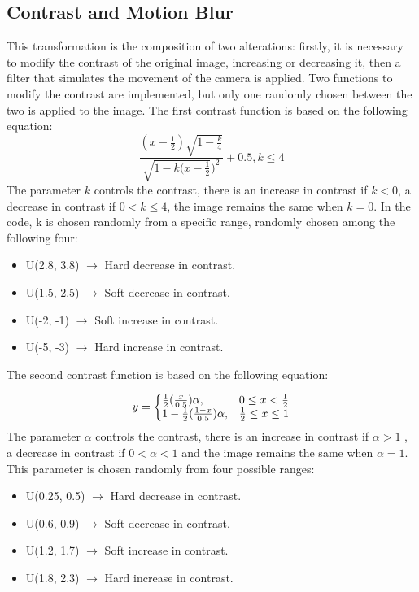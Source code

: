 \subsection{Contrast and Motion Blur}
This transformation is the composition of two alterations: firstly, it is necessary to modify the contrast of the original image, increasing or decreasing it, then a filter that simulates the movement of the camera is applied. Two functions to modify the contrast are implemented, but only one randomly chosen between the two is applied to the image.
The first contrast function is based on the following equation:
\[
	\frac{(x-\frac{1}{2})\sqrt{1-\frac{k}{4}}}{\sqrt{1-k(x-\frac{1}{2}})^2} + 0.5,  k\leq4
	\]
The parameter $k$ controls the contrast, there is an increase in contrast if $k<0$, a decrease in contrast if $0<k\leq4$, the image remains the same when 
$k=0$.
In the code, k is chosen randomly from a specific range, randomly chosen among the following four:
\begin{itemize}
    \item U(2.8, 3.8) $\to$ Hard decrease in contrast.
    \item U(1.5, 2.5) $\to$ Soft decrease in contrast.
    \item U(-2, -1) $\to$ Soft increase in contrast.
    \item U(-5, -3) $\to$ Hard increase in contrast.
\end{itemize}
The second contrast function is based on the following equation:

\[
y =
\left\{
\begin{array}{
  @{}%
  l@{\quad}%
  r@{}%
  >{{}}r@{}%
  >{{}}l@{}%
}
  \frac{1}{2} (\frac{x}{0.5})\alpha,    &   0\leq x <\frac{1}{2}\\
  1 - \frac{1}{2} (\frac{1-x}{0.5})\alpha,    &   \frac{1}{2} \leq x \leq 1\\
\end{array}
\right.
\]
The parameter $\alpha$ controls the contrast, there is an increase in contrast if $\alpha > 1$ , a decrease in contrast if $0 < \alpha < 1$ and the image remains the same when $\alpha = 1$. This parameter is chosen randomly from four possible ranges:
\begin{itemize}
    \item U(0.25, 0.5) $\to$ Hard decrease in contrast.
    \item U(0.6, 0.9) $\to$ Soft decrease in contrast.
    \item U(1.2, 1.7) $\to$ Soft increase in contrast.
    \item U(1.8, 2.3) $\to$ Hard increase in contrast.
\end{itemize}

